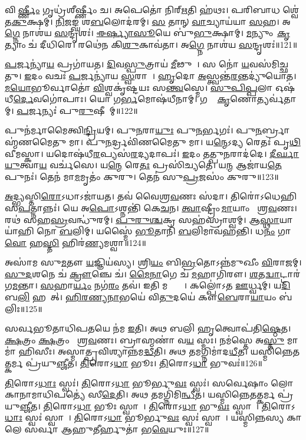 𑌵𑌿𑌶𑍀᳚\ul{𑌰𑍍𑌷𑍍𑌣𑍀𑌂} 𑌗𑍃𑌧𑍍𑌰॑𑌶𑍀𑌰𑍍𑌷𑍍𑌣𑍀𑌂 𑌚। 𑌅𑌪𑍇𑌤𑍋॑ 𑌨𑌿𑌰𑍍‌\ul{𑌋}𑌤𑌿 𑌹॑𑌥𑌃। 
𑌪𑌰𑌿𑌬𑌾𑌧 𑌶𑍍𑌵𑍇॑𑌤\ul{𑌕𑍁}𑌕𑍍𑌷𑌮𑍍‌। \ul{𑌨𑌿}𑌜𑌙𑍍𑌘॑ 𑌶\ul{𑌬}𑌲𑍋𑌦॑𑌰𑌮𑍍‌। 
\ul{𑌸} 𑌤𑌾𑌨𑍍‌ \ul{𑌵𑌾}𑌚𑍍𑌯𑌾𑌯॑𑌯𑌾 \ul{𑌸}𑌹। 𑌅\ul{𑌗𑍍𑌨𑍇} 𑌨𑌾𑌶॑𑌯 \ul{𑌸}𑌨𑍍𑌦𑍃𑌶𑌃॑। 
\ul{𑌈}\ul{𑌰𑍍𑌷𑍍𑌯𑌾}\ul{𑌸𑍂}𑌯𑍇 𑌬𑍁॑\ul{𑌭𑍁}𑌕𑍍𑌷𑌾𑌮𑍍‌। \ul{𑌮}𑌨𑍍𑌯𑍁𑌂 \ul{𑌕𑍃}𑌤𑍍𑌯𑌾𑌂 𑌚॑ 𑌦𑍀𑌧𑌿𑌰𑍇। 
𑌰𑌥𑍇॑𑌨 𑌕𑌿\ul{𑌶𑍁}𑌕𑌾𑌵॑𑌤𑌾। 𑌅\ul{𑌗𑍍𑌨𑍇} 𑌨𑌾𑌶॑𑌯 \ul{𑌸}𑌨𑍍𑌦𑍃𑌶𑌃॑॥121॥\anuvakamend


\ul{𑌪}𑌰𑍍𑌜𑌨𑍍𑌯𑌾॑\ul{𑌯} 𑌪𑍍𑌰𑌗𑌾॑𑌯𑌤। \ul{𑌦𑌿}𑌵\ul{𑌸𑍍𑌪𑍁}𑌤𑍍𑌰𑌾𑌯॑ \ul{𑌮𑍀}𑌢𑍁𑌷𑍇᳚। 
𑌸 𑌨𑍋॑ \ul{𑌯}𑌵𑌸॑𑌮𑌿𑌚𑍍𑌛𑌤𑍁। \ul{𑌇}𑌦𑌂 𑌵𑌚𑌃॑ \ul{𑌪}𑌰𑍍𑌜𑌨𑍍𑌯𑌾॑𑌯 \ul{𑌸𑍍𑌵}𑌰𑌾𑌜𑍇᳚। 
\ul{𑌹𑍃}𑌦𑍋 \ul{𑌅}𑌸𑍍𑌤𑍍𑌵𑌨𑍍𑌤॑\ul{𑌰}𑌨𑍍𑌤𑌦𑍍𑌯𑍁॑𑌯𑍋𑌤। \ul{𑌮}\ul{𑌯𑍋}𑌭𑍂𑌰𑍍𑌵𑌾𑌤𑍋॑ \ul{𑌵𑌿}𑌶𑍍𑌵𑌕𑍃॑𑌷𑍍𑌟𑌯𑌃 𑌸\ul{𑌨𑍍𑌤𑍍𑌵}𑌸𑍍𑌮𑍇। 
\ul{𑌸𑍁}\ul{𑌪𑌿}\ul{𑌪𑍍𑌪}𑌲𑌾 𑌓𑌷॑𑌧𑍀\ul{𑌰𑍍𑌦𑍇}𑌵𑌗𑍋॑𑌪𑌾𑌃। 𑌯𑍋 𑌗\ul{𑌰𑍍𑌭}𑌮𑍋𑌷॑𑌧𑍀𑌨𑌾𑌮𑍍‌। 
𑌗𑌵𑌾𑌂᳚ \ul{𑌕𑍃}𑌣𑍋𑌤𑍍𑌯𑌰𑍍𑌵॑𑌤𑌾𑌮𑍍‌। \ul{𑌪}𑌰𑍍𑌜𑌨𑍍𑌯𑌃॑ 𑌪𑍁\ul{𑌰𑍁}𑌷𑍀𑌣𑌾᳚𑌮𑍍‌॥122॥\anuvakamend


𑌪𑍁𑌨॑𑌰𑍍𑌮𑌾𑌮𑍈𑌤𑍍𑌵𑌿\ul{𑌨𑍍𑌦𑍍𑌰𑌿}𑌯𑌮𑍍‌। 𑌪𑍁\ul{𑌨}𑌰𑌾\ul{𑌯𑍁𑌃} 𑌪𑍁\ul{𑌨}𑌰𑍍𑌭𑌗𑌃॑। 
𑌪𑍁\ul{𑌨}𑌰𑍍𑌬𑍍𑌰𑌾𑌹𑍍𑌮॑𑌣𑌮𑍈𑌤𑍁 𑌮𑌾। 𑌪𑍁\ul{𑌨}𑌰𑍍𑌦𑍍𑌰𑌵𑌿॑𑌣𑌮𑍈𑌤𑍁 𑌮𑌾। 
𑌯\ul{𑌨𑍍𑌮𑍇}𑌽𑌦𑍍𑌯 𑌰𑍇𑌤𑌃॑ 𑌪𑍃\ul{𑌥𑌿}𑌵𑍀𑌮𑌸𑍍𑌕𑌾\sn{}। 𑌯𑌦𑍋𑌷॑𑌧𑍀\ul{𑌰}𑌪𑍍𑌯𑌸॑\ul{𑌰}𑌦𑍍𑌯𑌦𑌾𑌪𑌃॑। 
\ul{𑌇}𑌦𑌂 𑌤𑌤𑍍𑌪𑍁\ul{𑌨}𑌰𑌾𑌦॑𑌦𑍇। \ul{𑌦𑍀}\ul{𑌰𑍍𑌘𑌾}\ul{𑌯𑍁}𑌤𑍍𑌵𑌾\ul{𑌯} 𑌵𑌰𑍍𑌚॑𑌸𑍇। 
𑌯\ul{𑌨𑍍𑌮𑍇} 𑌰𑍇\ul{𑌤𑌃} 𑌪𑍍𑌰𑌸𑌿॑𑌚𑍍𑌯𑌤𑍇। 𑌯\ul{𑌨𑍍𑌮} 𑌆𑌜𑌾॑𑌯\ul{𑌤𑍇} 𑌪𑍁𑌨𑌃॑। 
𑌤𑍇𑌨॑ 𑌮𑌾\ul{𑌮}𑌮𑍃𑌤𑌂॑ 𑌕𑍁𑌰𑍁। 𑌤𑍇𑌨॑ 𑌸𑍁\ul{𑌪𑍍𑌰}𑌜𑌸𑌂॑ 𑌕𑍁𑌰𑍁॥123॥\anuvakamend


\ul{𑌅}𑌦𑍍𑌭𑍍𑌯𑌸𑍍𑌤𑌿\ul{𑌰𑍋}𑌽𑌧𑌾𑌽𑌜𑌾॑𑌯𑌤। 𑌤𑌵॑ 𑌵𑍈𑌶𑍍𑌰\ul{𑌵}𑌣𑌃 𑌸॑𑌦𑌾। 
𑌤𑌿𑌰𑍋॑𑌽𑌧𑍇𑌹𑌿 𑌸\ul{𑌪}𑌤𑍍𑌨𑌾𑌨𑍍𑌨𑌃॑। 𑌯𑍇 𑌅\ul{𑌪𑍋}𑌽𑌶𑍍𑌨𑌨𑍍𑌤𑌿॑ 𑌕𑍇\ul{𑌚}𑌨। 
\ul{𑌤𑍍𑌵𑌾}𑌷𑍍𑌟𑍍𑌰𑍀𑌂 \ul{𑌮𑌾}𑌯𑌾𑌂 𑌵𑍈᳚𑌶𑍍𑌰\ul{𑌵}𑌣𑌃। 𑌰𑌥॑ 𑌸𑌹\ul{𑌸𑍍𑌰}𑌵𑌨𑍍𑌧𑍁॑𑌰𑌮𑍍‌। 
\ul{𑌪𑍁}\ul{𑌰𑍁}\ul{𑌶𑍍𑌚}𑌕𑍍𑌰 𑌸𑌹॑𑌸𑍍𑌰𑌾𑌶𑍍𑌵𑌮𑍍‌। 𑌆\ul{𑌸𑍍𑌥𑌾}𑌯𑌾𑌯𑌾॑𑌹𑌿 𑌨𑍋 \ul{𑌬}𑌲𑌿𑌮𑍍‌। 
𑌯𑌸𑍍𑌮𑍈॑ \ul{𑌭𑍂}𑌤𑌾𑌨𑌿॑ \ul{𑌬}𑌲𑌿𑌮𑌾𑌵॑𑌹𑌨𑍍𑌤𑌿। 𑌧\ul{𑌨𑌂} 𑌗𑌾\ul{𑌵𑍋} 𑌹\ul{𑌸𑍍𑌤𑌿} 𑌹𑌿𑌰॑\ul{𑌣𑍍𑌯}𑌮𑌶𑍍𑌵𑌾\sn{}॥124॥


𑌅𑌸𑌾॑𑌮 𑌸𑍁\ul{𑌮}𑌤𑍗 \ul{𑌯}𑌜𑍍𑌞𑌿𑌯॑𑌸𑍍𑌯। 𑌶𑍍𑌰𑌿\ul{𑌯𑌂} 𑌬𑌿\ul{𑌭𑍍𑌰}𑌤𑍋𑌽𑌨𑍍𑌨॑𑌮𑍁𑌖𑍀𑌂 \ul{𑌵𑌿}𑌰𑌾𑌜𑌮𑍍‌᳚। 
\ul{𑌸𑍁}\ul{𑌦}\ar{}𑌶𑌨𑍇 𑌚॑ \ul{𑌕𑍍𑌰𑍗}𑌞𑍍𑌚𑍇 𑌚॑। \ul{𑌮𑍈}\ul{𑌨𑌾}𑌗𑍇 𑌚॑ \ul{𑌮}𑌹𑌾𑌗𑌿॑𑌰𑍗। 
\ul{𑌶}𑌤\ul{𑌦𑍍𑌵𑌾}𑌟𑍍𑌟𑌾𑌰॑𑌗\ul{𑌮}𑌨𑍍𑌤𑌾। \ul{𑌸}\ul{}𑌹𑌾\ul{𑌰𑍍𑌯𑌂} 𑌨𑌗॑\ul{𑌰𑌂} 𑌤𑌵॑। 
𑌇𑌤𑌿 𑌮𑌨𑍍𑌤𑍍𑌰𑌾𑌃᳚। 𑌕𑌲𑍍𑌪𑍋॑𑌽𑌤 \ul{𑌊}𑌰𑍍𑌧𑍍𑌵𑌮𑍍‌। 𑌯\ul{𑌦𑌿} 𑌬\ul{𑌲𑌿}\ul{} 𑌹𑌰𑍇᳚𑌤𑍍‌। 
\ul{𑌹𑌿}\ul{𑌰}\ul{𑌣𑍍𑌯}\ul{𑌨𑌾}𑌭𑌯𑍇॑ 𑌵𑌿\ul{𑌤𑍁}𑌦𑌯𑍇॑ 𑌕𑍗\ul{𑌬𑍇}𑌰𑌾\ul{𑌯𑌾}𑌯𑌂 𑌬॑𑌲𑌿𑌃॥125॥


𑌸𑌰𑍍𑌵𑌭𑍂𑌤𑌾𑌧𑌿𑌪𑌤𑌯𑍇 𑌨॑𑌮 \ul{𑌇}𑌤𑌿। 𑌅𑌥 𑌬𑌲𑌿 𑌹𑍃𑌤𑍍𑌵𑍋𑌪॑𑌤𑌿\ul{𑌷𑍍𑌠𑍇}𑌤। 
\ul{𑌕𑍍𑌷}𑌤𑍍𑌰𑌂 \ul{𑌕𑍍𑌷}𑌤𑍍𑌰𑌂 𑌵𑍈᳚𑌶𑍍𑌰\ul{𑌵}𑌣𑌃। 𑌬𑍍𑌰𑌾𑌹𑍍𑌮𑌣𑌾॑ 𑌵\ul{𑌯}\ul{} 𑌸𑍍𑌮𑌃। 
𑌨𑌮॑𑌸𑍍𑌤𑍇 𑌅\ul{𑌸𑍍𑌤𑍁} 𑌮𑌾 𑌮𑌾॑ 𑌹𑌿𑌸𑍀𑌃। 𑌅𑌸𑍍𑌮𑌾𑌤𑍍𑌪𑍍𑌰𑌵𑌿𑌶𑍍𑌯𑌾𑌨𑍍𑌨॑𑌮\ul{𑌦𑍍𑌧𑍀}𑌤𑌿। 
𑌅𑌥 𑌤𑌮𑌗𑍍𑌨𑌿𑌮𑌾॑𑌦\ul{𑌧𑍀}𑌤। 𑌯𑌸𑍍𑌮𑌿𑌨𑍍𑌨𑍇𑌤𑌤𑍍𑌕𑌰𑍍𑌮 𑌪𑍍𑌰॑𑌯𑍁\ul{𑌞𑍍𑌜𑍀}𑌤। 
\ul{𑌤𑌿}𑌰𑍋𑌽\ul{𑌧𑌾} 𑌭𑍂𑌃। \ul{𑌤𑌿}𑌰𑍋𑌽\ul{𑌧𑌾} 𑌭𑍁𑌵𑌃॑॥126॥


\ul{𑌤𑌿}𑌰𑍋𑌽\ul{𑌧𑌾𑌃} 𑌸𑍍𑌵𑌃॑। \ul{𑌤𑌿}𑌰𑍋𑌽\ul{𑌧𑌾} 𑌭𑍂𑌰𑍍𑌭𑍁\ul{𑌵𑌃} 𑌸𑍍𑌵𑌃॑। 
𑌸𑌰𑍍𑌵𑍇𑌷𑌾𑌂 𑌲𑍋𑌕𑌾𑌨𑌾𑌮𑌾𑌧𑌿𑌪𑌤𑍍𑌯𑍇॑ 𑌸𑍀\ul{𑌦𑍇}𑌤𑌿। 𑌅𑌥 𑌤𑌮𑌗𑍍𑌨𑌿॑𑌮𑌿\ul{𑌨𑍍𑌧𑍀}𑌤। 
𑌯𑌸𑍍𑌮𑌿𑌨𑍍𑌨𑍇𑌤𑌤𑍍𑌕𑌰𑍍𑌮 𑌪𑍍𑌰॑𑌯𑍁\ul{𑌞𑍍𑌜𑍀}𑌤। \ul{𑌤𑌿}𑌰𑍋𑌽\ul{𑌧𑌾} 𑌭𑍂𑌃 𑌸𑍍𑌵𑌾𑌹𑌾᳚। 
\ul{𑌤𑌿}𑌰𑍋𑌽\ul{𑌧𑌾} 𑌭𑍁\ul{𑌵𑌃} 𑌸𑍍𑌵𑌾𑌹𑌾᳚। \ul{𑌤𑌿}𑌰𑍋𑌽\ul{𑌧𑌾𑌃} 𑌸𑍍𑌵𑌃॑ 𑌸𑍍𑌵𑌾𑌹𑌾᳚। 
\ul{𑌤𑌿}𑌰𑍋𑌽\ul{𑌧𑌾} 𑌭𑍂𑌰𑍍𑌭𑍁\ul{𑌵𑌃} 𑌸𑍍𑌵𑌃॑ 𑌸𑍍𑌵𑌾𑌹𑌾᳚। 
𑌯𑌸𑍍𑌮𑌿𑌨𑍍𑌨𑌸𑍍𑌯 𑌕𑌾𑌲𑍇 𑌸𑌰𑍍𑌵𑌾 𑌆𑌹𑍁𑌤𑍀𑌰𑍍\mbox{}𑌹𑍁𑌤𑌾॑ 𑌭\ul{𑌵𑍇}𑌯𑍁𑌃॥127॥


